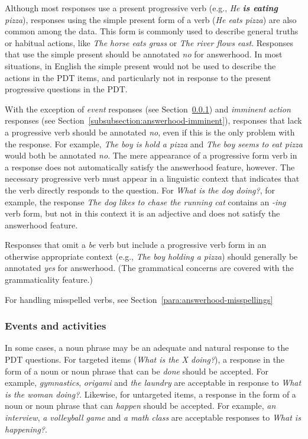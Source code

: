 \documentclass[12pt]{article}
\begin{document}
Although most responses use a present progressive verb (e.g., \textit{He \textbf{is eating} pizza}), responses using the simple present form of a verb (\textit{He eats pizza}) are also common among the data. This form is commonly used to describe general truths or habitual actions, like \textit{The horse eats grass} or \textit{The river flows east}. Responses that use the simple present should be annotated \textit{no} for answerhood. In most situations, in English the simple present would not be used to describe the actions in the PDT items, and particularly not in response to the present progressive questions in the PDT.

With the exception of \textit{event} responses (see Section~\ref{subsubsection:answerhood-events}) and \textit{imminent action} responses (see Section~\ref{subsubsection:answerhood-imminent}), responses that lack a progressive verb should be annotated \textit{no}, even if this is the only problem with the response. For example, \textit{The boy is hold a pizza} and \textit{The boy seems to eat pizza} would both be annotated \textit{no}. The mere appearance of a progressive form verb in a response does not automatically satisfy the answerhood feature, however. The necessary progressive verb must appear in a linguistic context that indicates that the verb directly responds to the question. For \textit{What is the dog doing?}, for example, the response \textit{The dog likes to chase the running cat} contains an \textit{-ing} verb form, but not in this context it is an adjective and does not satisfy the answerhood feature.

Responses that omit a \textit{be} verb but include a progressive verb form in an otherwise appropriate context (e.g., \textit{The boy holding a pizza}) should generally be annotated \textit{yes} for answerhood. (The grammatical concerns are covered with the grammaticality feature.)

For handling misspelled verbs, see Section~\ref{para:answerhood-misspellings}

\subsubsection{Events and activities}
\label{subsubsection:answerhood-events} In some cases, a noun phrase may be an adequate and natural response to the PDT questions. For targeted items (\textit{What is the X doing?}), a response in the form of a noun or noun phrase that can be \textit{done} should be accepted. For example, \textit{gymnastics}, \textit{origami} and \textit{the laundry} are acceptable in response to \textit{What is the woman doing?}. Likewise, for untargeted items, a response in the form of a noun or noun phrase that can \textit{happen} should be accepted. For example, \textit{an interview}, \textit{a volleyball game} and \textit{a math class} are acceptable responses to \textit{What is happening?}.
\end{document}
